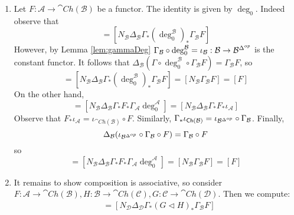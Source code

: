 \begin{enumerate}
    \item Let $F:\mathcal{A}\rightarrow \cat{Ch}(\mathcal{B})$ be a functor. The identity is given by $\deg_0$. Indeed observe that
    \begin{equation*}
        [\deg_0^\mathcal{B}\lhd F] = [N_\mathcal{B}\Delta_\mathcal{B}\Gamma_*(\deg_0^\mathcal{B})_*\Gamma_\mathcal{B} F]
    \end{equation*}
    However, by Lemma \ref{lem:gammaDeg} $\Gamma_\mathcal{B}\circ \deg_0^\mathcal{B} = \iota_\mathcal{B}:\mathcal{B}\rightarrow \mathcal{B}^{\Delta^{op}}$ is the constant functor. It follows that $\Delta_\mathcal{B}(\Gamma\circ \deg_0^\mathcal{B}\circ \Gamma_\mathcal{B}F) = \Gamma_\mathcal{B}F$, so
    \begin{equation*}
        [\deg_0^\mathcal{B}\lhd F] = [N_\mathcal{B}\Delta_\mathcal{B}\Gamma_*(\deg_0^\mathcal{B})_*\Gamma_\mathcal{B} F] = [N_\mathcal{B}\Gamma_\mathcal{B}F] = [F]
    \end{equation*}
    On the other hand,
    \begin{equation*}
        [F\lhd \deg_0^\mathcal{A}] = [N_\mathcal{B}\Delta_\mathcal{B}\Gamma_*F_*\Gamma_\mathcal{A}\deg_0^\mathcal{A}] = [N_\mathcal{B}\Delta_\mathcal{B}\Gamma_*F_*\iota_\mathcal{A}]
    \end{equation*}
    Observe that $F_*\iota_\mathcal{A} = \iota_{\cat{Ch}(\mathcal{B})}\circ F$. Similarly, $\Gamma_*\iota_{\textup{\textsf{Ch}}(\mathcal{B})} = \iota_{\mathcal{B}^{\Delta^{op}}}\circ\Gamma_\mathcal{B}$. Finally,
    \begin{equation*}
        \Delta_\mathcal{B}(\iota_{\mathcal{B}^{\Delta^{op}}}\circ\Gamma_\mathcal{B}\circ F) = \Gamma_\mathcal{B}\circ F
    \end{equation*}
    so
    \begin{equation*}
        [F\lhd \deg_0^\mathcal{A}] = [N_\mathcal{B}\Delta_\mathcal{B}\Gamma_*F_*\Gamma_\mathcal{A}\deg_0^\mathcal{A}] = [N_\mathcal{B}\Gamma_\mathcal{B}F] = [F]
    \end{equation*}
    \item It remains to show composition is associative, so consider $F:\mathcal{A}\rightarrow \cat{Ch}(\mathcal{B}),H:\mathcal{B}\rightarrow \cat{Ch}(\mathcal{C}),G:\mathcal{C}\rightarrow \cat{Ch}(\mathcal{D})$. Then we compute:
    \begin{align*}
        [(G\lhd H)\lhd F] &= [N_\mathcal{D}\Delta_\mathcal{D}\Gamma_*(G\lhd H)_*\Gamma_\mathcal{B}F] \\

\end{align*}
\end{enumerate}
